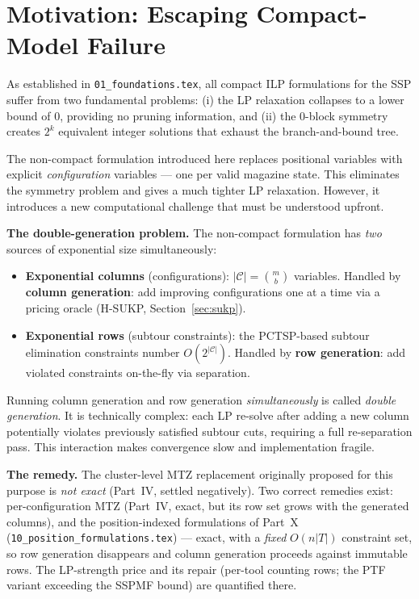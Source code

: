 \documentclass[11pt,a4paper]{article}
\theoremstyle{plain}
\theoremstyle{definition}
\begin{document}
\section{Motivation: Escaping Compact-Model Failure}
\label{sec:motivation}

As established in \texttt{01\_foundations.tex}, all compact ILP formulations
for the SSP suffer from two fundamental problems:
(i) the LP relaxation collapses to a lower bound of 0, providing no pruning
information, and
(ii) the 0-block symmetry creates $2^k$ equivalent integer solutions that
exhaust the branch-and-bound tree.

The non-compact formulation introduced here replaces positional variables with
explicit \emph{configuration} variables — one per valid magazine state. This
eliminates the symmetry problem and gives a much tighter LP relaxation. However,
it introduces a new computational challenge that must be understood upfront.

\begin{mdframed}[backgroundcolor=lightblue,linecolor=navyblue,linewidth=1pt,
  innerleftmargin=14pt,innerrightmargin=14pt,innertopmargin=8pt,innerbottommargin=8pt]
\textbf{The double-generation problem.}
The non-compact formulation has \emph{two} sources of exponential size
simultaneously:
\begin{itemize}
\item \textbf{Exponential columns} (configurations): $|\mathcal{C}| = \binom{m}{b}$
  variables. Handled by \textbf{column generation}: add improving configurations
  one at a time via a pricing oracle (H-SUKP, Section~\ref{sec:sukp}).
\item \textbf{Exponential rows} (subtour constraints): the PCTSP-based subtour
  elimination constraints number $O(2^{|\mathcal{C}|})$. Handled by
  \textbf{row generation}: add violated constraints on-the-fly via separation.
\end{itemize}
Running column generation and row generation \emph{simultaneously} is called
\emph{double generation}. It is technically complex: each LP re-solve after
adding a new column potentially violates previously satisfied subtour cuts,
requiring a full re-separation pass. This interaction makes convergence slow and
implementation fragile.

\medskip
\textbf{The remedy.}
The cluster-level MTZ replacement originally proposed for this purpose is
\emph{not exact} (Part~IV, settled negatively). Two correct remedies exist:
per-configuration MTZ (Part~IV, exact, but its row set grows with the generated
columns), and the position-indexed formulations of Part~X
(\texttt{10\_position\_formulations.tex}) — exact, with a \emph{fixed}
$O(n|T|)$ constraint set, so row generation disappears and column generation
proceeds against immutable rows. The LP-strength price and its repair (per-tool
counting rows; the PTF variant exceeding the SSPMF bound) are quantified there.
\end{mdframed}
\end{document}

